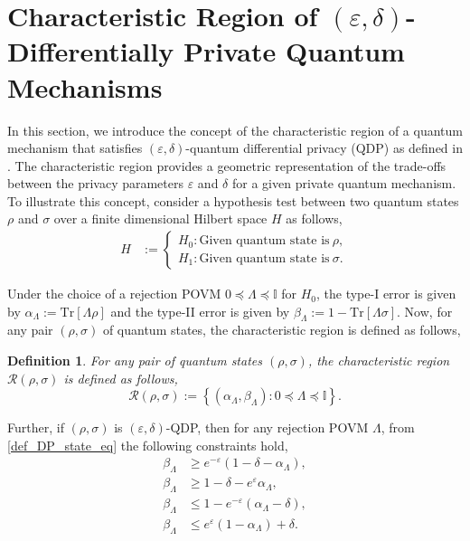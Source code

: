 \documentclass[onecolumn,ldraftcls, 11pt]{IEEEtran}
\newcommand{\tr}{\mathrm{Tr}}
\newcommand{\eps}{\varepsilon}
\newcommand*{\bbI}{\mathbb{I}}
\newcommand*{\cR}{\mathcal{R}}
\newtheorem{definition}{Definition}
\begin{document}
\section{Characteristic Region of $(\eps,\delta)$-Differentially Private Quantum Mechanisms}\label{sec_char_region}
In this section, we introduce the concept of the characteristic region of a quantum mechanism that satisfies $(\eps,\delta)$-quantum differential privacy (QDP) as defined in \cite[Definition $2$]{ZY2017}. The characteristic region provides a geometric representation of the trade-offs between the privacy parameters $\eps$ and $\delta$ for a given private quantum mechanism. To illustrate this concept, consider a hypothesis test between two quantum states $\rho$ and $\sigma$ over a finite dimensional Hilbert space $H$ as follows,
\begin{align}
    H &:= \begin{cases}
        H_0: \mbox{Given quantum state is} ~\rho,  \\
        H_1: \mbox{Given quantum state is} ~\sigma. 
    \end{cases}
\end{align}

Under the choice of a rejection POVM $0\preceq \Lambda \preceq \bbI$ for $H_0$, the type-I error is given by $\alpha_{\Lambda} := \tr\left[\Lambda \rho\right]$ and the type-II error is given by $\beta_{\Lambda} := 1 - \tr\left[\Lambda \sigma\right]$.
Now, for any pair  $(\rho,\sigma)$ of quantum states, the characteristic region is defined as follows,

\begin{definition}\label{def_char_region}
    For any pair of quantum states $(\rho,\sigma)$, the characteristic region $\cR(\rho,\sigma)$ is defined as follows,
    \begin{equation}
        \cR(\rho,\sigma) := \left\{(\alpha_{\Lambda},\beta_{\Lambda}) : 0 \preceq \Lambda \preceq \bbI\right\}.\label{def_char_region_eq}
    \end{equation}
\end{definition}

Further, if $(\rho,\sigma)$ is $(\eps,\delta)$-QDP, then for any rejection POVM $\Lambda$, from \eqref{def_DP_state_eq} the following constraints hold,
\begin{align}
    \beta_{\Lambda} &\geq e^{-\eps}(1-\delta -\alpha_{\Lambda}),\label{char_region_eq1}\\
    \beta_{\Lambda} &\geq 1 -\delta - e^{\eps}\alpha_{\Lambda},\label{char_region_eq2}\\
    \beta_{\Lambda} &\leq 1 - e^{-\eps}(\alpha_{\Lambda} - \delta),\label{char_region_eq3}\\
    \beta_{\Lambda} &\leq e^{\eps}(1- \alpha_{\Lambda}) + \delta.\label{char_region_eq4}
\end{align} 
\end{document}
